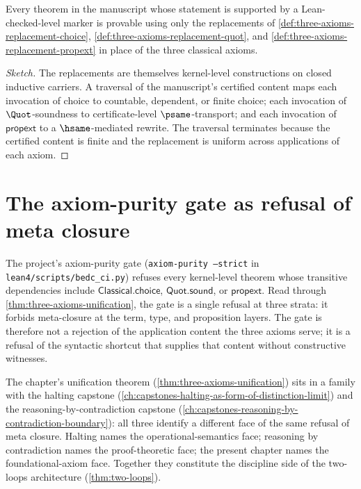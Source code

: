 \begin{theorem}
\label{thm:three-axioms-replacements-suffice}
Every theorem in the manuscript whose statement is supported by a Lean-checked-level marker is provable using only the replacements of \autoref{def:three-axioms-replacement-choice}, \autoref{def:three-axioms-replacement-quot}, and \autoref{def:three-axioms-replacement-propext} in place of the three classical axioms.
\end{theorem}

\begin{proof}[Sketch]
The replacements are themselves kernel-level constructions on closed inductive carriers. A traversal of the manuscript's certified content maps each invocation of choice to countable, dependent, or finite choice; each invocation of $\Quot$-soundness to certificate-level $\psame$-transport; and each invocation of $\mathsf{propext}$ to a $\hsame$-mediated rewrite. The traversal terminates because the certified content is finite and the replacement is uniform across applications of each axiom.
\end{proof}

\section{The axiom-purity gate as refusal of meta closure}
\label{sec:three-axioms-purity-gate}

\begin{remark}
\label{rem:three-axioms-gate-meaning}
The project's axiom-purity gate (\texttt{axiom-purity --strict} in \texttt{lean4/scripts/bedc\_ci.py}) refuses every kernel-level theorem whose transitive dependencies include $\mathsf{Classical.choice}$, $\mathsf{Quot.sound}$, or $\mathsf{propext}$. Read through \autoref{thm:three-axioms-unification}, the gate is a single refusal at three strata: it forbids meta-closure at the term, type, and proposition layers. The gate is therefore not a rejection of the application content the three axioms serve; it is a refusal of the syntactic shortcut that supplies that content without constructive witnesses.
\end{remark}

\begin{remark}
\label{rem:three-axioms-siblings}
The chapter's unification theorem (\autoref{thm:three-axioms-unification}) sits in a family with the halting capstone (\autoref{ch:capstones-halting-as-form-of-distinction-limit}) and the reasoning-by-contradiction capstone (\autoref{ch:capstones-reasoning-by-contradiction-boundary}): all three identify a different face of the same refusal of meta closure. Halting names the operational-semantics face; reasoning by contradiction names the proof-theoretic face; the present chapter names the foundational-axiom face. Together they constitute the discipline side of the two-loops architecture (\autoref{thm:two-loops}).
\end{remark}

